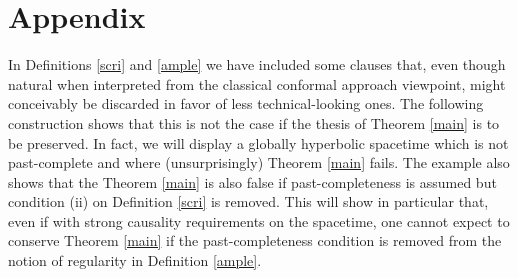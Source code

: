 



%
%
%
%
%
%
%

\section*{Appendix}
\label{sec:some-examples}
In Definitions \ref{scri} and \ref{ample} we have included some clauses that, even though natural when interpreted from the classical conformal approach viewpoint, might conceivably be discarded in favor of less technical-looking ones. The following construction shows that this is not the case if the thesis of Theorem \ref{main} is to be preserved. In fact, we will display a globally hyperbolic spacetime which is not past-complete and where (unsurprisingly) Theorem \ref{main} fails. The example also shows that the Theorem \ref{main} is also false if past-completeness is assumed but condition (ii) on Definition \ref{scri} is removed. This will show in particular that, even if with strong causality requirements on the spacetime, one cannot expect to conserve Theorem \ref{main} if the past-completeness condition is removed from the notion of regularity in Definition \ref{ample}.


